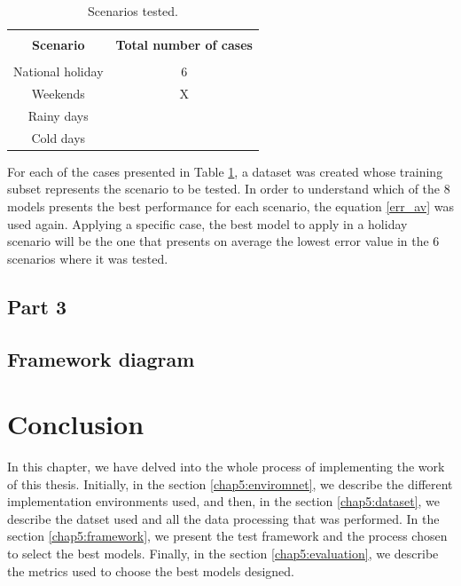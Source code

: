 \begin{longtable}{|c|c|}
    \caption{Scenarios tested.}
    \label{table5}\\
    \hline 
    & \\[-0.5ex]
    \textbf{Scenario} & {\centering\textbf{Total number of cases}}\\[1ex]
    \hline
    & \\[-0.5ex]
    National holiday & 6\\
    Weekends & X\\
    Rainy days & \\
    Cold days & \\[1ex]
    \hline
    

\end{longtable}

For each of the cases presented in Table \ref{table5}, a dataset was created whose training subset represents the scenario to be tested. In order to understand which of the 8 models presents the best performance for each scenario, the equation \ref{err_av} was used again. Applying a specific case, the best model to apply in a holiday scenario will be the one that presents on average the lowest error value in the 6 scenarios where it was tested.

\subsection{Part 3}

\subsection{Framework diagram}


\section{Conclusion}

In this chapter, we have delved into the whole process of implementing the work of this thesis. Initially, in the section \ref{chap5:enviromnet}, we describe the different implementation environments used, and then, in the section \ref{chap5:dataset}, we describe the datset used and all the data processing that was performed. In the section \ref{chap5:framework}, we present the test framework and the process chosen to select the best models. Finally, in the section \ref{chap5:evaluation}, we describe the metrics used to choose the best models designed.